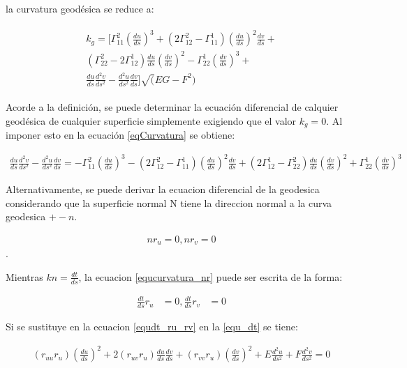 \documentclass{endm}
\begin{document}
la curvatura geod\'esica se reduce a:

\begin{align} 
\begin{split}
k_g = [ \Gamma_{11}^2 (\frac{du}{ds})^3 + (2 \Gamma_{12}^2 -  \Gamma_{11}^1 ) (\frac{du}{ds})^2 \frac{dv}{ds} +\\ (\Gamma_{22}^2 -  2 \Gamma_{12}^1 ) \frac{du}{ds} (\frac{dv}{ds})^2 - \Gamma_{22}^1 (\frac{dv}{ds})^3 +\\ \frac{du}{ds} \frac{d^2v}{ds^2} - \frac{d^2u}{ds^2} \frac{dv}{ds}] \sqrt(EG - F^2)
\label{eqCurvatura}
\end{split}
\end{align}

Acorde a la definici\'on, se puede determinar la ecuaci\'on diferencial de calquier geod\'esica de cualquier superficie simplemente exigiendo que el valor $k_g = 0$. Al imponer esto en la ecuaci\'on \ref{eqCurvatura} se obtiene:

\begin{align} 
\frac{du}{ds} \frac{d^2v}{ds^2} - \frac{d^2u}{ds^2} \frac{dv}{ds} = -  \Gamma_{11}^2 (\frac{du}{ds})^3 - (2 \Gamma_{12}^2 -  \Gamma_{11}^1 ) (\frac{du}{ds})^2 \frac{dv}{ds} + (2 \Gamma_{12}^1 - \Gamma_{22}^2) \frac{du}{ds} (\frac{dv}{ds})^2 + \Gamma_{22}^1 (\frac{dv}{ds})^3
\label{eqCurvatura}
\end{align}

Alternativamente, se puede derivar la ecuacion diferencial de la geodesica considerando que la superficie normal N tiene la direccion normal a la curva geodesica $+- n$.

\begin{align} 
n r_u = 0, n r_v = 0
\label{equcurvatura_nr}
\end{align}.

Mientras $kn = \frac{dt}{ds} $, la ecuacion 
\ref{equcurvatura_nr} 
puede ser escrita de la forma:

\begin{align} 
\frac{dt}{ds} r_u &=0,\frac{dt}{ds} r_v &=0
\label{equdt_ru_rv}
\end{align}

Si se sustituye en la ecuacion \ref{equdt_ru_rv} en la \ref{equ_dt} se tiene:

\begin{align} 
(r_{uu} r_u) (\frac{du}{ds})^2 + 2 (r_{uv} r_u) \frac{du}{ds} \frac{dv}{ds} + (r_{vv} r_u) (\frac{dv}{ds})^2 + E \frac{d^2u}{ds^2} + F \frac{d^2v}{ds^2} = 0
\label{equ_dt_EF}
\end{align}
\end{document}
